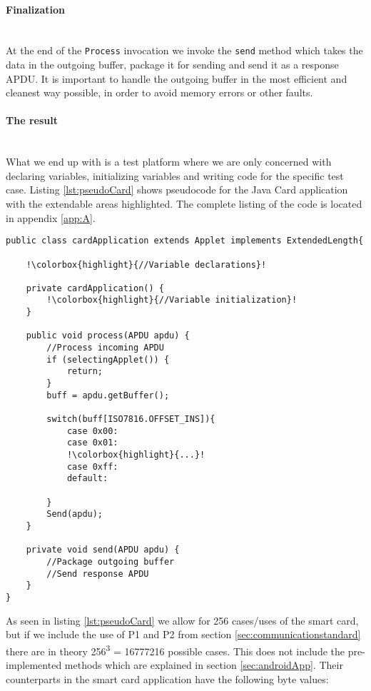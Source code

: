 \paragraph{Finalization}\mbox{}\\
At the end of the \texttt{Process} invocation we invoke the \texttt{send} method which takes the data in the outgoing buffer, package it for sending and send it as a response APDU. It is important to handle the outgoing buffer in the most efficient and cleanest way possible, in order to avoid memory errors or other faults.

\paragraph{The result}\mbox{}\\
What we end up with is a test platform where we are only concerned with declaring variables, initializing variables and writing code for the specific test case. Listing \ref{lst:pseudoCard} shows pseudocode for the Java Card application with the extendable areas highlighted. The complete listing of the code is located in appendix \ref{app:A}.


\begin{lstlisting}[caption=Pseudo code for javacard test application., label=lst:pseudoCard,escapechar=!]
public class cardApplication extends Applet implements ExtendedLength{

    !\colorbox{highlight}{//Variable declarations}!

    private cardApplication() {
    	!\colorbox{highlight}{//Variable initialization}!
    }

    public void process(APDU apdu) {
    	//Process incoming APDU
        if (selectingApplet()) {
			return;
		}
        buff = apdu.getBuffer();

    	switch(buff[ISO7816.OFFSET_INS]){
            case 0x00:
            case 0x01:
            !\colorbox{highlight}{...}!
            case 0xff:
            default:

    	}
    	Send(apdu);
    }

    private void send(APDU apdu) {
    	//Package outgoing buffer
    	//Send response APDU
    }
}
\end{lstlisting}

As seen in listing \ref{lst:pseudoCard} we allow for 256 cases/uses of the smart card, but if we include the use of P1 and P2 from section \ref{sec:communicationstandard} there are in theory 256\textsuperscript{3} = 16777216 possible cases. This does not include the pre-implemented methods which are explained in section \ref{sec:androidApp}. Their counterparts in the smart card application have the following byte values:

